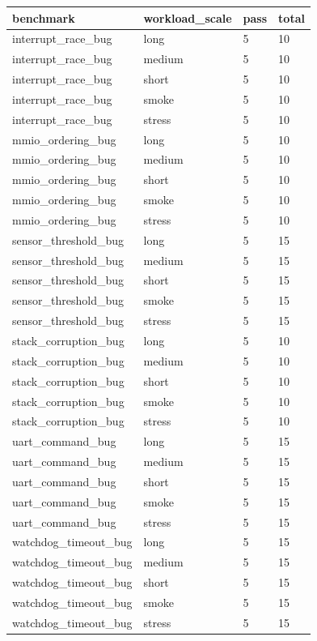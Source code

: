 \begin{tabular}{llll}
 \hline
benchmark & workload\_scale & pass & total \\
 \hline
interrupt\_race\_bug & long & 5 & 10 \\
interrupt\_race\_bug & medium & 5 & 10 \\
interrupt\_race\_bug & short & 5 & 10 \\
interrupt\_race\_bug & smoke & 5 & 10 \\
interrupt\_race\_bug & stress & 5 & 10 \\
mmio\_ordering\_bug & long & 5 & 10 \\
mmio\_ordering\_bug & medium & 5 & 10 \\
mmio\_ordering\_bug & short & 5 & 10 \\
mmio\_ordering\_bug & smoke & 5 & 10 \\
mmio\_ordering\_bug & stress & 5 & 10 \\
sensor\_threshold\_bug & long & 5 & 15 \\
sensor\_threshold\_bug & medium & 5 & 15 \\
sensor\_threshold\_bug & short & 5 & 15 \\
sensor\_threshold\_bug & smoke & 5 & 15 \\
sensor\_threshold\_bug & stress & 5 & 15 \\
stack\_corruption\_bug & long & 5 & 10 \\
stack\_corruption\_bug & medium & 5 & 10 \\
stack\_corruption\_bug & short & 5 & 10 \\
stack\_corruption\_bug & smoke & 5 & 10 \\
stack\_corruption\_bug & stress & 5 & 10 \\
uart\_command\_bug & long & 5 & 15 \\
uart\_command\_bug & medium & 5 & 15 \\
uart\_command\_bug & short & 5 & 15 \\
uart\_command\_bug & smoke & 5 & 15 \\
uart\_command\_bug & stress & 5 & 15 \\
watchdog\_timeout\_bug & long & 5 & 15 \\
watchdog\_timeout\_bug & medium & 5 & 15 \\
watchdog\_timeout\_bug & short & 5 & 15 \\
watchdog\_timeout\_bug & smoke & 5 & 15 \\
watchdog\_timeout\_bug & stress & 5 & 15 \\
 \hline
\end{tabular}
